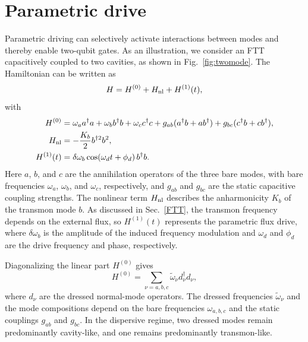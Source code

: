 \section*{Parametric drive }Parametric driving can selectively activate interactions between modes and thereby enable two-qubit gates. As an illustration, we consider an FTT capacitively coupled to two cavities, as shown in Fig.~\ref{fig:twomode}. The Hamiltonian can be written as~\cite{Petrescu2023}
\begin{equation}
    H = H^{(0)} + H_{\rm nl} + H^{(1)}(t),
\end{equation}
with
\begin{align}
    H^{(0)}
    &=
    \omega_a a^\dagger a
    + \omega_b b^\dagger b
    + \omega_c c^\dagger c
    + g_{ab}(a^\dagger b + a b^\dagger)
    + g_{bc}(c^\dagger b + c b^\dagger), \\
    H_{\rm nl}
    &=
    -\frac{K_b}{2} b^{\dagger 2} b^2, \\
    H^{(1)}(t)
    &=
    \delta\omega_b \cos(\omega_d t+\phi_d)\, b^\dagger b.
\end{align}
Here \(a\), \(b\), and \(c\) are the annihilation operators of the three bare modes, with bare frequencies \(\omega_a\), \(\omega_b\), and \(\omega_c\), respectively, and \(g_{ab}\) and \(g_{bc}\) are the static capacitive coupling strengths. The nonlinear term \(H_{\rm nl}\) describes the anharmonicity \(K_b\) of the transmon mode \(b\). As discussed in Sec.~\ref{FTT}, the transmon frequency depends on the external flux, so \(H^{(1)}(t)\) represents the parametric flux drive, where \(\delta\omega_b\) is the amplitude of the induced frequency modulation and \(\omega_d\) and \(\phi_d\) are the drive frequency and phase, respectively.

Diagonalizing the linear part \(H^{(0)}\) gives
\begin{equation}
    H^{(0)}
    =
    \sum_{\nu=a,b,c} \tilde{\omega}_\nu d_\nu^\dagger d_\nu,
    \label{eq:H0_diag_compact}
\end{equation}
where \(d_\nu\) are the dressed normal-mode operators. The dressed frequencies \(\tilde{\omega}_\nu\) and the mode compositions depend on the bare frequencies \(\omega_{a,b,c}\) and the static couplings \(g_{ab}\) and \(g_{bc}\). In the dispersive regime, two dressed modes remain predominantly cavity-like, and one remains predominantly transmon-like.

